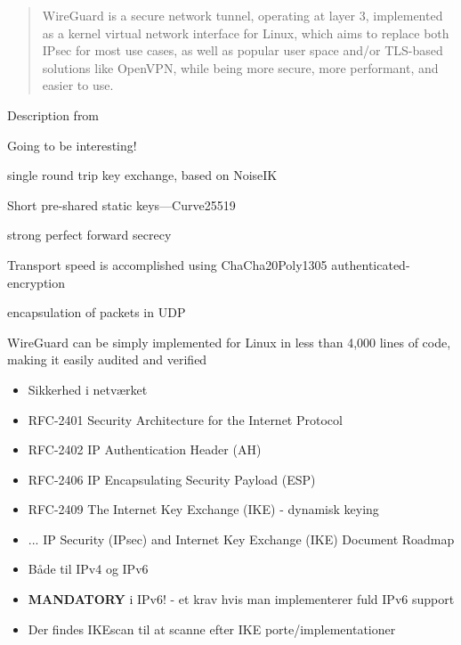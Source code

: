\documentclass[Screen16to9,17pt]{foils}
\begin{document}




\begin{quote}\small
WireGuard is a secure network tunnel, operating at layer 3, implemented as a kernel virtual network interface for Linux, which aims to replace both IPsec for most use cases, as well as popular user space and/or TLS-based solutions like OpenVPN, while being more secure, more performant, and easier to use.
\end{quote}

Description from 

\begin{list2}
\item Going to be interesting!
\item single round trip key exchange, based on NoiseIK
\item Short pre-shared static keys—Curve25519
\item strong perfect forward secrecy
\item Transport
speed is accomplished using ChaCha20Poly1305 authenticated-encryption
\item encapsulation of packets in UDP
\item WireGuard can be
simply implemented for Linux in less than 4,000 lines of code, making it easily audited and verified
\end{list2}




\begin{itemize}
\item Sikkerhed i netværket
\item RFC-2401 Security Architecture for the Internet Protocol
\item RFC-2402 IP Authentication Header (AH)
\item RFC-2406 IP Encapsulating Security Payload (ESP)
\item RFC-2409 The Internet Key Exchange (IKE) - dynamisk keying
\item ... IP Security (IPsec) and Internet Key Exchange (IKE) Document Roadmap\\
\item Både til IPv4 og IPv6
\item {\bfseries MANDATORY} i IPv6! - et krav hvis man implementerer
  fuld IPv6 support
\item Der findes IKEscan til at scanne efter IKE
  porte/implementationer\\
\end{itemize}
\end{document}

